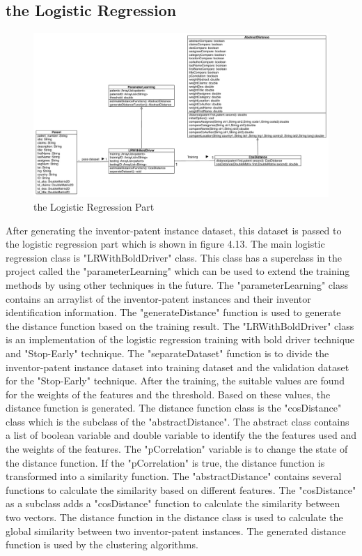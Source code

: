 \subsection{the Logistic Regression}
\begin{figure}
\centering
\includegraphics[width=\headwidth]{logisticRegression.pdf}
\caption{the Logistic Regression Part}
\end{figure}
After generating the inventor-patent instance dataset, this dataset is passed to the logistic regression part which is shown in figure 4.13. The main logistic regression class is "LRWithBoldDriver" class. This class has a superclass in the project called the "parameterLearning" which can be used to extend the training methods by using other techniques in the future. The "parameterLearning" class contains an arraylist of the inventor-patent instances and their inventor identification information. The "generateDistance" function is used to generate the distance function based on the training result. The "LRWithBoldDriver" class is an implementation of the logistic regression training with bold driver technique and "Stop-Early" technique. The "separateDataset" function is to divide the inventor-patent instance dataset into training dataset and the validation dataset for the "Stop-Early" technique. After the training, the suitable values are found for the weights of the features and the threshold. Based on these values, the distance function is generated. The distance function class is the "cosDistance" class which is the subclass of the "abstractDistance". The abstract class contains a list of boolean variable and double variable to identify the the features used and the weights of the features. The "pCorrelation" variable is to change the state of the distance function. If the "pCorrelation" is true, the distance function is transformed into a similarity function. The "abstractDistance" contains several functions to calculate the similarity based on different features. The "cosDistance" as a subclass adds a "cosDistance" function to calculate the similarity between two vectors. The distance function in the distance class is used to calculate the global similarity between two inventor-patent instances. The generated distance function is used by the clustering algorithms.

